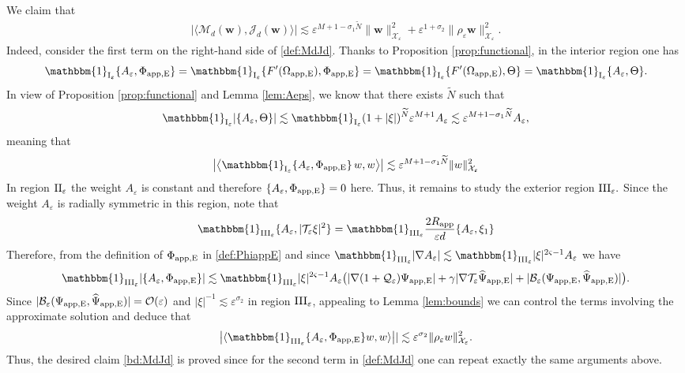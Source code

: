 \documentclass[11pt,reqno,a4paper]{amsart}
\def\eps{\varepsilon}
\newcommand{\cB}{\mathcal{B}}
\newcommand{\cJ}{\mathcal{J}}
\newcommand{\cM}{\mathcal{M}}
\newcommand{\cO}{\mathcal{O}}
\newcommand{\cQ}{\mathcal{Q}}
\newcommand{\cT}{\mathcal{T}}
\newcommand{\cX}{\mathcal{X}}
\newcommand{\1}{\mathbbm{1}}
\theoremstyle{definition}
\theoremstyle{definition}
\numberwithin{equation}{section}
\begin{document}
We claim that
\begin{align}
\label{bd:MdJd}
\big|\langle \cM_{d}({\mathbf w}),\cJ_{d}({\mathbf w})\rangle\big|\lesssim \eps^{M+1-\sigma_1\widetilde{N}}\|{\mathbf w}\|^2_{\boldsymbol{\cX}_\eps}+\eps^{1+\sigma_2}\|\rho_\eps{\mathbf w}\|^2_{\boldsymbol{\cX}_\eps}.
\end{align}
Indeed, consider the first term on the right-hand side of \cref{def:MdJd}. Thanks to Proposition \ref{prop:functional}, in the interior region one has
\begin{align}
    \mathbbm{1}_{{\rm I}_\eps}\{A_\eps,\Phi_{\rm app,E}\}=\mathbbm{1}_{{\rm I}_\eps}\{F'(\Omega_{\rm app,E}),\Phi_{\rm app,E}\}=\mathbbm{1}_{{\rm I}_\eps}\{F'(\Omega_{\rm app,E}),\Theta\}=\mathbbm{1}_{{\rm I}_\eps}\{A_\eps,\Theta\}.
\end{align}
In view of Proposition \ref{prop:functional} and Lemma \ref{lem:Aeps}, we know that there exists $\widetilde{N}$ such that
\begin{align}
    \mathbbm{1}_{{\rm I}_\eps}|\{A_\eps,\Theta\}|\lesssim  \mathbbm{1}_{{\rm I}_\eps}(1+|\xi|)^{\widetilde{N}}\eps^{M+1}A_\eps\lesssim \eps^{M+1-\sigma_1\widetilde{N}}A_\eps,
\end{align}
meaning that 
\begin{align}
\big|\big\langle\mathbbm{1}_{{\rm I}_\eps} \{A_{\eps},\Phi_{\rm app,E}\}\,w,w\big\rangle\big|\lesssim \eps^{M+1-\sigma_1\widetilde{N}}\|w\|^2_{\cX_\eps}\end{align}
In region ${\rm II}_{\eps}$  the weight $A_\eps$ is constant and therefore $\{A_{\eps},\Phi_{\rm app,E}\}=0$ here. Thus, it remains to study the exterior region ${\rm III}_{\eps}.$ Since the weight $A_\eps$ is radially symmetric in this region, note that 
\begin{align}
    \mathbbm{1}_{{\rm III}_\eps}\{A_\eps, |\cT_{\eps}\xi|^2\}=  \mathbbm{1}_{{\rm III}_\eps}\frac{2R_{\rm app}}{\eps d}\{A_\eps,\xi_1\}
\end{align} Therefore, from the definition of $\Phi_{\rm app,E}$ in \cref{def:PhiappE} and since $\mathbbm{1}_{{\rm III}_\eps}|\nabla A_{\eps}|\lesssim \mathbbm{1}_{{\rm III}_\eps}|\xi|^{2\varsigma-1}A_\eps$ we have
\begin{align}
    \mathbbm{1}_{{\rm III}_\eps}|\{A_\eps, \Phi_{\rm app,E}\}|\lesssim \mathbbm{1}_{{\rm III}_\eps}|\xi|^{2\varsigma-1}A_\eps \big(|\nabla (1+\cQ_{\eps})\Psi_{\rm app,E}|+\gamma|\nabla \cT_\eps\widehat{\Psi}_{\rm app,E}|+|\cB_\eps(\Psi_{\rm app, E},{\widehat \Psi}_{\rm app, E})|\big).
\end{align}
Since $|\cB_\eps(\Psi_{\rm app, E},{\widehat \Psi}_{\rm app, E})|=\cO(\eps)$ and $|\xi|^{-1}\lesssim \eps^{\sigma_2} $ in region ${\rm III}_\eps$, appealing to Lemma \ref{lem:bounds} we can control the terms involving the approximate solution and deduce that 
\begin{align}
   \big| \langle\mathbbm{1}_{{\rm III}_\eps}\{A_\eps,\Phi_{\rm app,E}\} w,w \rangle\big||\lesssim  \eps^{\sigma_2}\|\rho_\eps w\|_{\cX_\eps}^2.
\end{align}
Thus, the desired claim \cref{bd:MdJd} is proved since for the second term in \cref{def:MdJd} one can repeat exactly the same arguments above.
\end{document}
